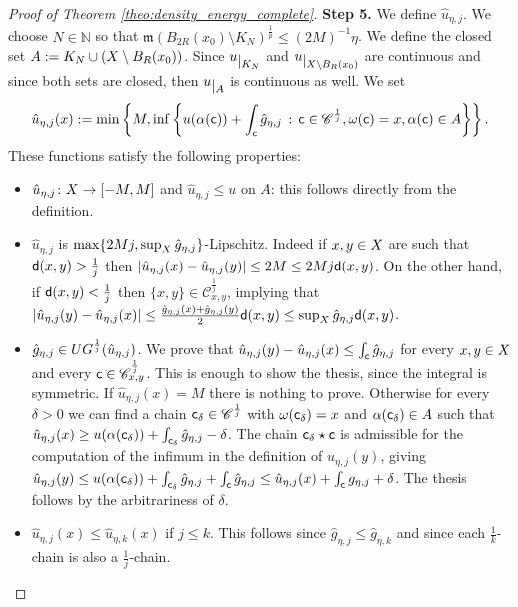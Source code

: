 \documentclass[12pt]{amsart}
\newcommand{\N}{\mathbb{N}}
\newcommand{\sfd}{{\sf d}}
\newcommand{\restr}[1]{\lower3pt\hbox{$|_{#1}$}}
\newcommand{\X}{{\rm X}}
\newcommand{\mm}{\mathfrak m}
\theoremstyle{definition}
\newcommand{\sfc}{{\sf c}}
\newcommand{\Chain}[1]{\mathscr{C}^{#1}}
\newcommand{\UG}[1]{{\rm UG}^{#1}}
\begin{document}
\begin{proof}[Proof of Theorem \ref{theo:density_energy_complete}]
    {\bf Step 5.} We define $\hat{u}_{\eta,j}$. We choose $N \in \N$ so that $\mm(B_{2R}(x_0) \setminus K_N)^{\frac{1}{p}} \le (2M)^{-1}\eta$. We define the closed set $A := K_N \cup (\X \setminus B_R(x_0))$. Since $u\restr{K_N}$ and $u\restr{X\setminus B_R(x_0)}$ are continuous and since both sets are closed, then $u\restr{A}$ is continuous as well. 
    We set
    $$\hat{u}_{\eta,j}(x) := \min\left\{ M, \inf\left\{ u(\alpha(\sfc)) + \int_\sfc \hat{g}_{\eta,j} \,:\, \sfc \in \Chain{\frac{1}{j}}, \omega(\sfc) = x, \alpha(\sfc) \in A\right\} \right\}.$$
    These functions satisfy the following properties:
        \begin{itemize}
            \item[(a)] $\hat{u}_{\eta,j}\colon \X \to [-M,M]$ and $\hat{u}_{\eta,j} \le u$ on $A$: this follows directly from the definition.
            \item[(b)] $\hat{u}_{\eta,j}$ is $\max\{2Mj, \sup_\X \hat{g}_{\eta,j}\}$-Lipschitz. Indeed if $x,y\in \X$ are such that $\sfd(x,y) > \frac{1}{j}$ then $\vert \hat{u}_{\eta,j}(x) - \hat{u}_{\eta,j}(y)\vert \le 2M \le 2Mj\sfd(x,y)$. On the other hand, if $\sfd(x,y)<\frac{1}{j}$ then $\{x,y\}\in\Chain{\frac{1}{j}}_{x,y}$, implying that $\vert \hat{u}_{\eta,j}(y) - \hat{u}_{\eta,j}(x)\vert \le \frac{\hat{g}_{\eta,j}(x) + \hat{g}_{\eta,j}(y)}{2}\sfd(x,y) \le \sup_\X \hat{g}_{\eta,j} \sfd(x,y)$.
            \item[(c)] $\hat{g}_{\eta,j} \in \UG{\frac{1}{j}}(\hat{u}_{\eta,j})$. We prove that $\hat{u}_{\eta,j}(y) - \hat{u}_{\eta,j}(x) \le \int_{\sfc}\hat{g}_{\eta,j}$ for every $x,y\in \X$ and every $\sfc \in \Chain{\frac{1}{j}}_{x,y}$. This is enough to show the thesis, since the integral is symmetric. If $\hat{u}_{\eta,j}(x) = M$ there is nothing to prove. Otherwise for every $\delta > 0$ we can find a chain $\sfc_\delta \in \Chain{\frac{1}{j}}$ with $\omega(\sfc_\delta) = x$ and $\alpha(\sfc_\delta) \in A$ such that $\hat{u}_{\eta,j}(x) \ge u(\alpha(\sfc_\delta)) + \int_{\sfc_\delta} \hat{g}_{\eta,j} - \delta$. The chain $\sfc_{\delta} \star \sfc$ is admissible for the computation of the infimum in the definition of $\hat{u}_{\eta,j}(y)$, giving $\hat{u}_{\eta,j}(y) \le u(\alpha(\sfc_\delta)) + \int_{\sfc_\delta} \hat{g}_{\eta,j} + \int_\sfc \hat{g}_{\eta,j} \le \hat{u}_{\eta,j}(x) + \int_\sfc g_{\eta,j} + \delta$. The thesis follows by the arbitrariness of $\delta$.
            \item[(d)] $\hat{u}_{\eta,j}(x) \le \hat{u}_{\eta,k}(x)$ if $j\le k$. This follows since $\hat{g}_{\eta,j} \le \hat{g}_{\eta,k}$ and since each $\frac{1}{k}$-chain is also a $\frac{1}{j}$-chain.

\end{itemize}
\end{proof}
\end{document}
